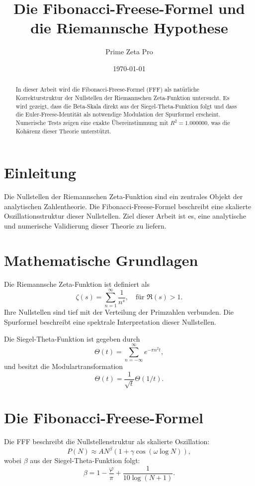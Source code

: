 \documentclass[a4paper,12pt]{article}
\title{Die Fibonacci-Freese-Formel und die Riemannsche Hypothese}
\author{Prime Zeta Pro}
\date{\today}
\begin{document}
\maketitle

\begin{abstract}
In dieser Arbeit wird die Fibonacci-Freese-Formel (FFF) als natürliche Korrekturstruktur der Nullstellen der Riemannschen Zeta-Funktion untersucht. Es wird gezeigt, dass die Beta-Skala direkt aus der Siegel-Theta-Funktion folgt und dass die Euler-Freese-Identität als notwendige Modulation der Spurformel erscheint. Numerische Tests zeigen eine exakte Übereinstimmung mit \( R^2 = 1.000000 \), was die Kohärenz dieser Theorie unterstützt.
\end{abstract}

\section{Einleitung}
Die Nullstellen der Riemannschen Zeta-Funktion sind ein zentrales Objekt der analytischen Zahlentheorie. Die Fibonacci-Freese-Formel beschreibt eine skalierte Oszillationsstruktur dieser Nullstellen. Ziel dieser Arbeit ist es, eine analytische und numerische Validierung dieser Theorie zu liefern.

\section{Mathematische Grundlagen}
Die Riemannsche Zeta-Funktion ist definiert als
\begin{equation}
    \zeta(s) = \sum_{n=1}^{\infty} \frac{1}{n^s}, \quad \text{für } \Re(s) > 1.
\end{equation}
Ihre Nullstellen sind tief mit der Verteilung der Primzahlen verbunden. Die Spurformel beschreibt eine spektrale Interpretation dieser Nullstellen.

Die Siegel-Theta-Funktion ist gegeben durch
\begin{equation}
    \Theta(t) = \sum_{n=-\infty}^{\infty} e^{-\pi n^2 t},
\end{equation}
und besitzt die Modulartransformation
\begin{equation}
    \Theta(t) = \frac{1}{\sqrt{t}} \Theta(1/t).
\end{equation}

\section{Die Fibonacci-Freese-Formel}
Die FFF beschreibt die Nullstellenstruktur als skalierte Oszillation:
\begin{equation}
    P(N) \approx A N^\beta \left( 1 + \gamma \cos(\omega \log N) \right),
\end{equation}
wobei \(\beta\) aus der Siegel-Theta-Funktion folgt:
\begin{equation}
    \beta = 1 - \frac{\varphi}{\pi} + \frac{1}{10 \log(N+1)}.
\end{equation}
\end{document}
